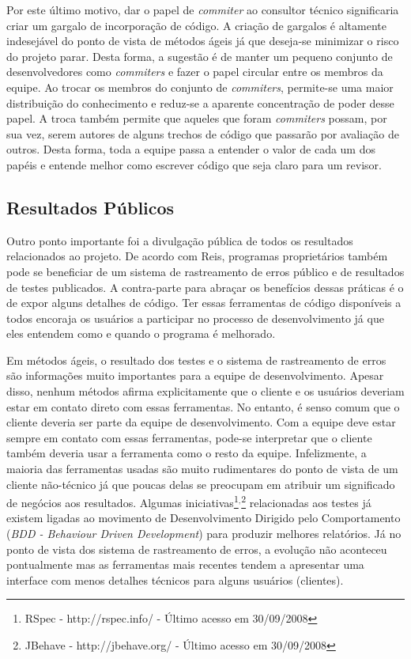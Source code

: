 Por este último motivo, dar o papel de \emph{commiter} ao consultor
técnico significaria criar um gargalo de incorporação de código. A
criação de gargalos é altamente indesejável do ponto de vista de
métodos ágeis já que deseja-se minimizar o risco do projeto
parar. Desta forma, a sugestão é de manter um pequeno conjunto de
desenvolvedores como \emph{commiters} e fazer o papel circular entre
os membros da equipe. Ao trocar os membros do conjunto de
\emph{commiters}, permite-se uma maior distribuição do conhecimento e
reduz-se a aparente concentração de poder desse papel. A troca também
permite que aqueles que foram \emph{commiters} possam, por sua vez,
serem autores de alguns trechos de código que passarão por avaliação
de outros. Desta forma, toda a equipe passa a entender o valor de cada
um dos papéis e entende melhor como escrever código que seja claro
para um revisor.

\subsection{Resultados Públicos}
\label{subsec:publicity}


Outro ponto importante foi a divulgação pública de todos os resultados
relacionados ao projeto. De acordo com Reis, programas proprietários
também pode se beneficiar de um sistema de rastreamento de erros
público e de resultados de testes publicados. A contra-parte para
abraçar os benefícios dessas práticas é o de expor alguns detalhes de
código. Ter essas ferramentas de código disponíveis a todos encoraja
os usuários a participar no processo de desenvolvimento já que eles
entendem como e quando o programa é melhorado.

Em métodos ágeis, o resultado dos testes e o sistema de rastreamento
de erros são informações muito importantes para a equipe de
desenvolvimento. Apesar disso, nenhum métodos afirma explicitamente
que o cliente e os usuários deveriam estar em contato direto com essas
ferramentas. No entanto, é senso comum que o cliente deveria ser
parte da equipe de desenvolvimento. Com a equipe deve estar sempre em
contato com essas ferramentas, pode-se interpretar que o cliente
também deveria usar a ferramenta como o resto da equipe. Infelizmente,
a maioria das ferramentas usadas são muito rudimentares do ponto de
vista de um cliente não-técnico já que poucas delas se preocupam em
atribuir um significado de negócios aos resultados. Algumas
iniciativas\footnote{RSpec - http://rspec.info/ - Último acesso em
  30/09/2008}$^{, }$\footnote{JBehave - http://jbehave.org/ - Último
  acesso em 30/09/2008} relacionadas aos testes já existem ligadas ao
movimento de Desenvolvimento Dirigido pelo Comportamento (\emph{BDD -
  Behaviour Driven Development}) \cite{North2006} para produzir
melhores relatórios. Já no ponto de vista dos sistema de rastreamento
de erros, a evolução não aconteceu pontualmente mas as ferramentas
mais recentes tendem a apresentar uma interface com menos detalhes
técnicos para alguns usuários (clientes).

